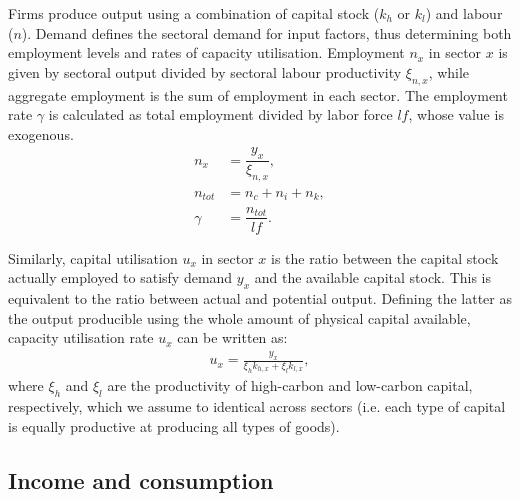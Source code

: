 \documentclass[authoryear]{article}
\begin{document}
Firms produce output using a combination of capital stock ($k_h$ or $k_l$) and labour ($n$). Demand defines the sectoral demand for input factors, thus determining both employment levels and rates of capacity utilisation. Employment $n_x$ in sector $x$ is given by sectoral output divided by sectoral labour productivity $\xi_{n,x}$, while aggregate employment is the sum of employment in each sector. The employment rate $\gamma$ is calculated as total employment divided by labor force $lf$, whose value is exogenous.
\begin{align}
n_x&=\dfrac{y_x}{\xi_{n,x}}, \\
n_{tot} &= n_c + n_i + n_k, \\
\gamma&=\dfrac{n_{tot}}{lf}.
\end{align}

Similarly, capital utilisation $u_x$ in sector $x$ is the ratio between the capital stock actually employed to satisfy demand $y_x$ and the available capital stock. This is equivalent to the ratio between actual and potential output. Defining the latter as the output producible using the whole amount of physical capital available, capacity utilisation rate $u_x$ can be written as:
\begin{gather}
u_x = \frac{y_x}{\xi_{h} k_{h,x} + \xi_{l} k_{l,x}},
\end{gather}
where $\xi_{h}$ and $\xi_{l}$ are the productivity of high-carbon and low-carbon capital, respectively, which we assume to identical across sectors (i.e. each type of capital is equally productive at producing all types of goods). 

\subsection{Income and consumption}
\label{sec:income}
\end{document}
